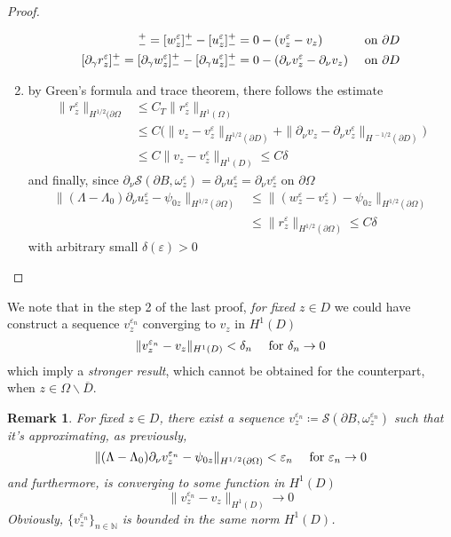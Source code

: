 \documentclass[10pt, a4paper, twoside, openright]{book}
\theoremstyle{definition}
\theoremstyle{plain}
\theoremstyle{plain}
\theoremstyle{plain}
\theoremstyle{plain}
\newtheorem{remark}[subsection]{Remark}
\theoremstyle{plain}
\theoremstyle{plain}
\theoremstyle{plain}
\theoremstyle{plain}
\let\epsilon\varepsilon
\begin{document}
\begin{proof}
\begin{enumerate}
  \begin{align}
   [r^\epsilon_z]^+_- = [w^\epsilon_z]^+_- -[u^\epsilon_z]^+_- &=0 - (v^\epsilon_z - v_z) && \textup{ on }\partial D \\
   [\partial_\gamma r^\epsilon_z]^+_- = [\partial_\gamma w^\epsilon_z]^+_- -[\partial_\gamma u^\epsilon_z]^+_-&= 0 - (\partial_\nu v^\epsilon_z - \partial_\nu v_z) && \textup{ on }\partial D 
  \end{align}
  \item by Green's formula and trace theorem, there follows the estimate
  \begin{align}
   \|r^\epsilon_z\|_{H^{1/2}(\partial \Omega} & \leq C_T\|r^\epsilon_z\|_{H^1(\Omega)} \\
   & \leq C\bigl(\|v_z - v^\epsilon_z\|_{H^{1/2}(\partial D)} + \|\partial_\nu v_z - \partial_\nu v^\epsilon_z\|_{H^{\, -1/2}(\partial D)}\bigr) \\
   & \leq C \|v_z - v^\epsilon_z\|_{H^1(D)}\leq C\delta
  \end{align}
  and finally, since $\partial_\nu\mathcal{S}(\partial B, \omega^\epsilon_z) = \partial_\nu u^\epsilon_z = \partial_\nu v^\epsilon_z$ on $\partial \Omega$
  \begin{align}
   \|(\Lambda - \Lambda_0)\partial_\nu u^\epsilon_z - \psi_{0z}\|_{H^{1/2}(\partial\Omega)} &\leq \|(w^\epsilon_z- v^\epsilon_z) - \psi_{0z}\|_{H^{1/2}(\partial\Omega)} \\
   &\leq\|r^\epsilon_z\|_{H^{1/2}(\partial \Omega)}\leq C\delta
  \end{align}
  with arbitrary small $\delta(\epsilon)>0$
 \end{enumerate}
\end{proof}
We note that in the step 2 of the last proof, \emph{for fixed $z \in D$} we could have construct a sequence $v^{\epsilon_n}_z$ converging to $v_z$ in $H^1(D)$
\begin{equation}
 \|v^{\epsilon_n}_z - v_z\|_{H^1(D)} < \delta_n \quad \textup{ for }\delta_n \to 0
\end{equation}
which imply a \emph{stronger result}, which cannot be obtained for the counterpart, when $z\in\Omega\backslash\overline{D}$.
\begin{remark}
 For fixed $z\in D$, there exist a sequence $v^{\epsilon_n}_z\coloneqq\mathcal{S}(\partial B, \omega^{\epsilon_n}_z)$ such that it's approximating, as previously,
\begin{equation}
 \|(\Lambda - \Lambda_0)\partial_\nu v^{\epsilon_n}_z - \psi_{0z}\|_{H^{1/2}(\partial\Omega)} < \epsilon_n \quad \textup{ for }\epsilon_n\to 0
\end{equation}
 and furthermore, is converging to some function in $H^1(D)$
\begin{equation}
 \|v^{\epsilon_n}_z - v_z\|_{H^1(D)} \to 0
\end{equation}
 Obviously, $\{v^{\epsilon_n}_z\}_{n\in\mathbb{N}}$ is bounded in the same norm $H^1(D)$.
\end{remark}
\end{document}
